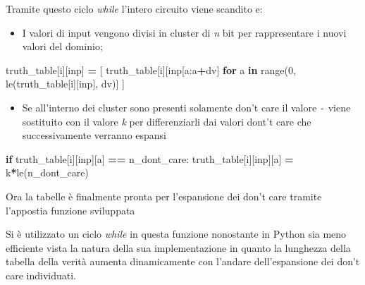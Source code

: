 \documentclass[
]{book}
\newenvironment{Shaded}{\begin{snugshade}}{\end{snugshade}}
\newcommand{\BuiltInTok}[1]{#1}
\newcommand{\ControlFlowTok}[1]{\textcolor[rgb]{0.13,0.29,0.53}{\textbf{#1}}}
\newcommand{\DecValTok}[1]{\textcolor[rgb]{0.00,0.00,0.81}{#1}}
\newcommand{\KeywordTok}[1]{\textcolor[rgb]{0.13,0.29,0.53}{\textbf{#1}}}
\newcommand{\NormalTok}[1]{#1}
\newcommand{\OperatorTok}[1]{\textcolor[rgb]{0.81,0.36,0.00}{\textbf{#1}}}
\newcommand{\StringTok}[1]{\textcolor[rgb]{0.31,0.60,0.02}{#1}}
\providecommand{\tightlist}{%
  \setlength{\itemsep}{0pt}\setlength{\parskip}{0pt}}
\begin{document}
\newpage

Tramite questo ciclo \emph{while} l'intero circuito viene scandito e:

\begin{itemize}
\tightlist
\item
  I valori di input vengono divisi in cluster di \emph{n} bit per rappresentare i nuovi valori del dominio;
\end{itemize}

\begin{Shaded}
\begin{Highlighting}[]
\NormalTok{truth\_table[i][}\StringTok{\textquotesingle{}inp\textquotesingle{}}\NormalTok{] }\OperatorTok{=}\NormalTok{ [}
\NormalTok{   truth\_table[i][}\StringTok{\textquotesingle{}inp\textquotesingle{}}\NormalTok{[a:a}\OperatorTok{+}\NormalTok{dv]}
   \ControlFlowTok{for}\NormalTok{ a }\KeywordTok{in} \BuiltInTok{range}\NormalTok{(}\DecValTok{0}\NormalTok{, le(truth\_table[i][}\StringTok{\textquotesingle{}inp\textquotesingle{}}\NormalTok{], dv)]}
\NormalTok{ ]}
\end{Highlighting}
\end{Shaded}

\begin{itemize}
\tightlist
\item
  Se all'interno dei cluster sono presenti solamente don't care il valore \texttt{-} viene sostituito con il valore \emph{k} per differenziarli dai valori dont't care che successivamente verranno espansi
\end{itemize}

\begin{Shaded}
\begin{Highlighting}[]
\ControlFlowTok{if}\NormalTok{ truth\_table[i][}\StringTok{\textquotesingle{}inp\textquotesingle{}}\NormalTok{][a] }\OperatorTok{==}\NormalTok{ n\_dont\_care:}
\NormalTok{  truth\_table[i][}\StringTok{\textquotesingle{}inp\textquotesingle{}}\NormalTok{][a] }\OperatorTok{=} \StringTok{\textquotesingle{}k\textquotesingle{}}\OperatorTok{*}\NormalTok{le(n\_dont\_care)}
\end{Highlighting}
\end{Shaded}

Ora la tabelle è finalmente pronta per l'espansione dei don't care tramite l'appostia funzione sviluppata

Si è utilizzato un ciclo \emph{while} in questa funzione nonostante in Python sia meno efficiente vista la natura della sua implementazione in quanto la lunghezza della tabella della verità aumenta dinamicamente con l'andare dell'espansione dei don't care individuati.
\end{document}
